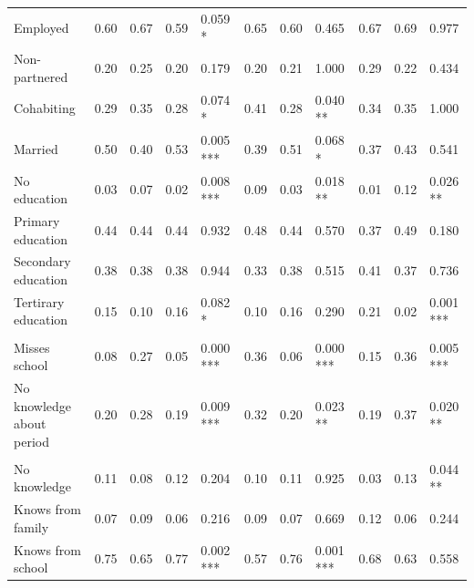 \documentclass[
]{article}
\begin{document}
\begin{landscape}
\begin{table}[!h]
{\begin{threeparttable}
\begin{tabular}[t]{lllllllllll}
\hspace{1em}Employed & 0.60 & 0.67 & 0.59 & 0.059  * & 0.65 & 0.60 & 0.465 & 0.67 & 0.69 & 0.977\\
\hspace{1em}Non-partnered & 0.20 & 0.25 & 0.20 & 0.179 & 0.20 & 0.21 & 1.000 & 0.29 & 0.22 & 0.434\\
\hspace{1em}Cohabiting & 0.29 & 0.35 & 0.28 & 0.074  * & 0.41 & 0.28 & 0.040 ** & 0.34 & 0.35 & 1.000\\
\hspace{1em}Married & 0.50 & 0.40 & 0.53 & 0.005 *** & 0.39 & 0.51 & 0.068  * & 0.37 & 0.43 & 0.541\\
\hspace{1em}No education & 0.03 & 0.07 & 0.02 & 0.008 *** & 0.09 & 0.03 & 0.018 ** & 0.01 & 0.12 & 0.026 **\\
\hspace{1em}Primary education & 0.44 & 0.44 & 0.44 & 0.932 & 0.48 & 0.44 & 0.570 & 0.37 & 0.49 & 0.180\\
\hspace{1em}Secondary education & 0.38 & 0.38 & 0.38 & 0.944 & 0.33 & 0.38 & 0.515 & 0.41 & 0.37 & 0.736\\
\hspace{1em}Tertirary education & 0.15 & 0.10 & 0.16 & 0.082  * & 0.10 & 0.16 & 0.290 & 0.21 & 0.02 & 0.001 ***\\
\addlinespace[0.8em]
\multicolumn{11}{l}{\textit{Daughter-related variables}}\\
\hspace{1em}Misses school & 0.08 & 0.27 & 0.05 & 0.000 *** & 0.36 & 0.06 & 0.000 *** & 0.15 & 0.36 & 0.005 ***\\
\hspace{1em}No knowledge about period & 0.20 & 0.28 & 0.19 & 0.009 *** & 0.32 & 0.20 & 0.023 ** & 0.19 & 0.37 & 0.020 **\\
\addlinespace[0.8em]
\multicolumn{11}{l}{\textit{Daughters' knowledge about contraception}}\\
\hspace{1em}No knowledge & 0.11 & 0.08 & 0.12 & 0.204 & 0.10 & 0.11 & 0.925 & 0.03 & 0.13 & 0.044 **\\
\hspace{1em}Knows from family & 0.07 & 0.09 & 0.06 & 0.216 & 0.09 & 0.07 & 0.669 & 0.12 & 0.06 & 0.244\\
\hspace{1em}Knows from school & 0.75 & 0.65 & 0.77 & 0.002 *** & 0.57 & 0.76 & 0.001 *** & 0.68 & 0.63 & 0.558\\

\end{tabular}
\end{threeparttable}}
\end{table}
\end{landscape}
\end{document}
